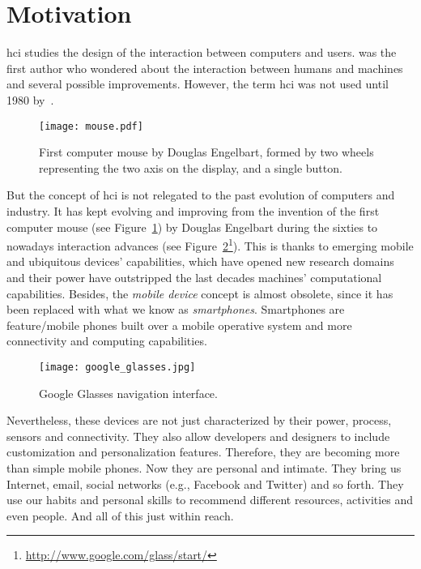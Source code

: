 \section{Motivation}
\label{sec:motivation}

\ac{hci} studies the design of the interaction between computers and users. 
\citet{carlisle1976evaluating} was the first author who wondered about the 
interaction between humans and machines and several possible improvements. 
However, the term \ac{hci} was not used until 1980 by~\citet{card1980keystroke}.


\begin{figure}[H]
\centering
\texttt{[image: mouse.pdf]}
\caption{First computer mouse by Douglas Engelbart, formed by two wheels 
representing the two axis on the display, and a single button.}
\label{fig:mouse}
\end{figure}

But the concept of \ac{hci} is not relegated to the past evolution of computers 
and industry. It has kept evolving and improving from the invention of the first
computer mouse (see Figure~\ref{fig:mouse}) by Douglas Engelbart during the 
sixties to nowadays interaction advances (see Figure~\ref{fig:google_glasses}\footnote{\url{http://www.google.com/glass/start/}}).
This is thanks to emerging mobile and ubiquitous devices' capabilities, which
have opened new research domains and their power have outstripped the last
decades machines' computational capabilities. Besides, the \textit{mobile device}
concept is almost obsolete, since it has been replaced with what we know as
\textit{smartphones}. Smartphones are feature/mobile phones built over a mobile
operative system and more connectivity and computing capabilities. 

\begin{figure}[H]
\centering
\texttt{[image: google\_glasses.jpg]}
\caption{Google Glasses navigation interface.}
\label{fig:google_glasses}
\end{figure}

Nevertheless, these devices are not just characterized by their power, process,
sensors and connectivity. They also allow developers and designers to include
customization and personalization features. Therefore, they are becoming more
than simple mobile phones. Now they are personal and intimate. They bring us
Internet, email, social networks (e.g., Facebook and Twitter) and so forth. They use
our habits and personal skills to recommend different resources, activities and
even people. And all of this just within reach.

